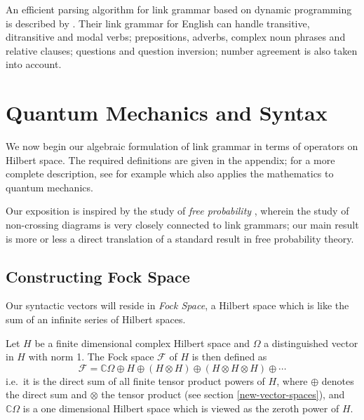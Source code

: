 \documentclass[12pt]{report}
\begin{document}
An efficient parsing algorithm for link grammar based on dynamic programming is described by \cite{Sleator:91}. Their link grammar for English can handle transitive, ditransitive and modal verbs; prepositions, adverbs, complex noun phrases and relative clauses; questions and question inversion; number agreement is also taken into account.

\section{Quantum Mechanics and Syntax}

We now begin our algebraic formulation of link grammar in terms of operators on Hilbert space. The required definitions are given in the appendix; for a more complete description, see for example \cite{Kreyszig:89} which also applies the mathematics to quantum mechanics.


Our exposition is inspired by the study of \emph{free probability} \cite{Voiculescu:97}, wherein the study of non-crossing diagrams is very closely connected to link grammars; our main result is more or less a direct translation of a standard result in free probability theory.

\subsection{Constructing Fock Space}

Our syntactic vectors will reside in \emph{Fock Space}, a Hilbert space which is like the sum of an infinite series of Hilbert spaces.


Let $H$ be a finite dimensional complex Hilbert space and $\Omega$ a distinguished vector in $H$ with norm 1. The Fock space $\mathcal{F}$ of $H$ is then defined as
$$\mathcal{F} = \mathbb{C}\Omega \oplus H \oplus (H \otimes H) \oplus (H \otimes H \otimes H) \oplus \cdots$$
i.e.~it is the direct sum of all finite tensor product powers of $H$, where $\oplus$ denotes the direct sum and $\otimes$ the tensor product (see section \ref{new-vector-spaces}), and $\mathbb{C}\Omega$ is a one dimensional Hilbert space which is viewed as the zeroth power of $H$.
\end{document}

